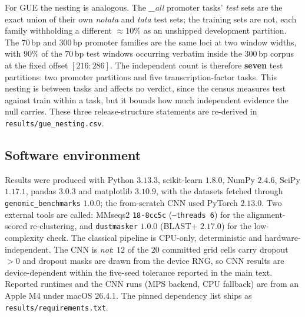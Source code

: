 \documentclass[11pt,a4paper]{article}
\begin{document}
For GUE the nesting is analogous. The \textit{\_all} promoter tasks' \emph{test} sets are the exact
union of their own \textit{notata} and \textit{tata} test sets; the training sets are not, each
family withholding a different ${\approx}10\%$ as an unshipped development partition. The $70$\,bp
and $300$\,bp promoter families are the same loci at two window widths, with $90\%$ of the $70$\,bp
test windows occurring verbatim inside the $300$\,bp corpus at the fixed offset $[216{:}286]$. The
independent count is therefore \textbf{seven} test partitions: two promoter partitions and five
transcription-factor tasks. This nesting is between tasks and affects no verdict, since the census
measures test against train within a task, but it bounds how much independent evidence the null
carries. These three release-structure statements are re-derived in
\texttt{results/gue\_nesting.csv}.

\subsection{Software environment}\label{sec:s-env}
Results were produced with Python $3.13.3$, scikit-learn $1.8.0$, NumPy $2.4.6$, SciPy $1.17.1$,
pandas $3.0.3$ and matplotlib $3.10.9$, with the datasets fetched through
\texttt{genomic\_benchmarks} $1.0.0$; the from-scratch CNN used PyTorch $2.13.0$. Two external tools
are called: MMseqs2 \texttt{18-8cc5c} (\texttt{--threads 6}) for the alignment-scored re-clustering,
and \texttt{dustmasker} $1.0.0$ (BLAST+ $2.17.0$) for the low-complexity check. The classical
pipeline is CPU-only, deterministic and hardware-independent. The CNN is \emph{not}: $12$ of the
$20$ committed grid cells carry dropout $>0$ and dropout masks are drawn from the device RNG, so
CNN results are device-dependent within the five-seed tolerance reported in the main text. Reported
runtimes and the CNN runs (MPS backend, CPU fallback) are from an Apple M4 under macOS $26.4.1$.
The pinned dependency list ships as \texttt{results/requirements.txt}.
\end{document}
